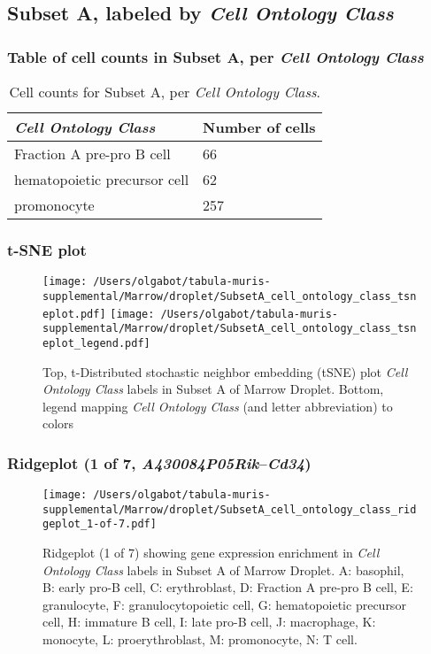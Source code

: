 \subsection{Subset A, labeled by \emph{Cell Ontology Class}}
\subsubsection{Table of cell counts in Subset A, per \emph{Cell Ontology Class}}\begin{table}[h]
\centering
\label{my-label}
\begin{tabular}{@{}ll@{}}
\toprule

\emph{Cell Ontology Class}& Number of cells \\ \midrule
Fraction A pre-pro B cell & 66 \\

hematopoietic precursor cell & 62 \\

promonocyte & 257 \\
\bottomrule
\end{tabular}
\caption{Cell counts for Subset A, per \emph{Cell Ontology Class}.}
\end{table}

\clearpage
\subsubsection{t-SNE plot}
\begin{figure}[h]
\centering
\texttt{[image: /Users/olgabot/tabula-muris-supplemental/Marrow/droplet/SubsetA\_cell\_ontology\_class\_tsneplot.pdf]}
\texttt{[image: /Users/olgabot/tabula-muris-supplemental/Marrow/droplet/SubsetA\_cell\_ontology\_class\_tsneplot\_legend.pdf]}
\caption{Top, t-Distributed stochastic neighbor embedding (tSNE) plot  \emph{Cell Ontology Class} labels in Subset A of Marrow Droplet. Bottom, legend mapping \emph{Cell Ontology Class} (and letter abbreviation) to colors}
\end{figure}


\clearpage

\subsubsection{Ridgeplot (1 of 7, \emph{A430084P05Rik}--\emph{Cd34})}
\begin{figure}[h]
\centering
\texttt{[image: /Users/olgabot/tabula-muris-supplemental/Marrow/droplet/SubsetA\_cell\_ontology\_class\_ridgeplot\_1-of-7.pdf]}

\caption{ Ridgeplot (1 of 7)  showing gene expression enrichment in \emph{Cell Ontology Class} labels in Subset A of Marrow Droplet. A: basophil, B: early pro-B cell, C: erythroblast, D: Fraction A pre-pro B cell, E: granulocyte, F: granulocytopoietic cell, G: hematopoietic precursor cell, H: immature B cell, I: late pro-B cell, J: macrophage, K: monocyte, L: proerythroblast, M: promonocyte, N: T cell.}
\end{figure}



